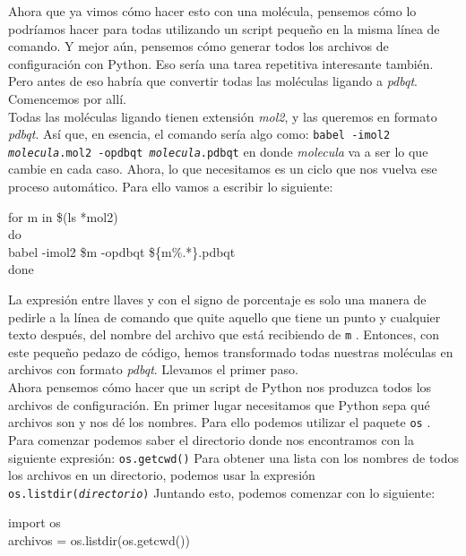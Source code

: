 \documentclass[10pt,letterpaper]{article}
\newcommand{\inlinecode}[1]{
\colorbox{light-gray}{\texttt{#1}}
}
\newenvironment{Code}
{
\begin{lrbox}{\selvestebox}%
\begin{minipage}{\dimexpr\columnwidth-2\fboxsep\relax}
\fontfamily{\ttdefault}\selectfont
}
{\end{minipage}\end{lrbox}%
\begin{center}
\colorbox{light-gray}{\usebox{\selvestebox}}
\end{center}
}
\begin{document}
Ahora que ya vimos c\'omo hacer esto con una mol\'ecula, pensemos c\'omo lo podr\'iamos hacer para todas utilizando un script peque\~no en la misma l\'inea de comando. Y mejor a\'un, pensemos c\'omo generar todos los archivos de configuraci\'on con Python. Eso ser\'ia una tarea repetitiva interesante tambi\'en. Pero antes de eso habr\'ia que convertir todas las mol\'eculas ligando a \emph{pdbqt}. Comencemos por all\'i.\\

Todas las mol\'eculas ligando tienen extensi\'on \emph{mol2}, y las queremos en formato \emph{pdbqt}. As\'i que, en esencia, el comando ser\'ia algo como: \inlinecode{babel -imol2 \emph{molecula}.mol2 -opdbqt \emph{molecula}.pdbqt} en donde \emph{molecula} va a ser lo que cambie en cada caso. Ahora, lo que necesitamos es un ciclo que nos vuelva ese proceso autom\'atico. Para ello vamos a escribir lo siguiente:

\begin{Code}
for m in \$(ls *mol2)\\
do\\
babel -imol2 \$m -opdbqt \$\{m\%.*\}.pdbqt\\
done
\end{Code}

La expresi\'on entre llaves y con el signo de porcentaje es solo una manera de pedirle a la l\'inea de comando que quite aquello que tiene un punto y cualquier texto despu\'es, del nombre del archivo que est\'a recibiendo de \inlinecode{m}. Entonces, con este peque\~no pedazo de c\'odigo, hemos transformado todas nuestras mol\'eculas en archivos con formato \emph{pdbqt}. Llevamos el primer paso.\\

Ahora pensemos c\'omo hacer que un script de Python nos produzca todos los archivos de configuraci\'on. En primer lugar necesitamos que Python sepa qu\'e archivos son y nos d\'e los nombres. Para ello podemos utilizar el paquete \inlinecode{os}. Para comenzar podemos saber el directorio donde nos encontramos con la siguiente expresi\'on: \inlinecode{os.getcwd()} Para obtener una lista con los nombres de todos los archivos en un directorio, podemos usar la expresi\'on \inlinecode{os.listdir(\emph{directorio})} Juntando esto, podemos comenzar con lo siguiente:

\begin{Code}
import os\\
archivos = os.listdir(os.getcwd())
\end{Code}
\end{document}
